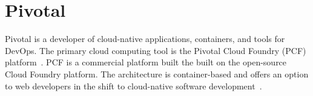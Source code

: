 \section{Pivotal}

Pivotal is a developer of cloud-native applications, 
containers, and tools for DevOps. The primary cloud 
computing tool is the Pivotal Cloud Foundry (PCF) 
platform~\cite{hid-sp18-404-Pivotal2017}. PCF is a 
commercial platform built the built on the open-source 
Cloud Foundry platform. The architecture is container-based 
and offers an option to web developers in the shift to 
cloud-native software development~\cite{hid-sp18-404-Darrow2016}. 
